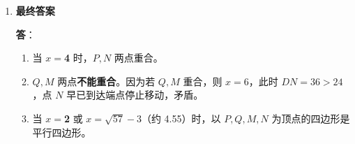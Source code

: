 \documentclass[UTF8]{ctexart}
\newenvironment{redenv}{\color{red}}{}
\newenvironment{detailedanalysis}{%
    \color{red}
    \begin{enumerate}[label=\textbf{第\arabic*步：}, leftmargin=*, align=left, itemsep=1.5ex]
}{%
    \end{enumerate}
}
\begin{document}
\begin{redenv}
\begin{detailedanalysis}
此时 $PN = x^2 + 2x - 24$

\begin{itemize}
    \item 若 $x < 6$：$QM = 24 - 4x$
    
    方程：$x^2 + 2x - 24 = 24 - 4x$
    \begin{align*}
    x^2 + 6x - 48 &= 0
    \end{align*}
    
    求根公式：$x = \dfrac{-6 + \sqrt{36 + 192}}{2} = \dfrac{-6 + \sqrt{228}}{2} = -3 + \sqrt{57} \approx 4.55$
    
    在 $(4, 6)$ 范围内，有效。
    
    \item 若 $x > 6$：$QM = 4x - 24$
    
    方程：$x^2 + 2x - 24 = 4x - 24$
    \begin{align*}
    x^2 - 2x &= 0 \\
    x(x - 2) &= 0
    \end{align*}
    
    $x = 0$（舍去）或 $x = 2$（不在 $x > 6$ 范围，舍去）
\end{itemize}

\textbf{约束条件检查}：

所有点都不能超出边界，即：
\begin{itemize}
    \item $AP = 2x \leq 24$，即 $x \leq 12$
    \item $BQ = x \leq 24$
    \item $CM = 3x \leq 24$，即 $x \leq 8$
    \item $DN = x^2 \leq 24$，即 $x \leq \sqrt{24} \approx 4.9$
\end{itemize}

最严格的约束是 $x \leq \sqrt{24} \approx 4.9$。

因此只有 $x = 2$ 和 $x = -3 + \sqrt{57} \approx 4.55$ 满足条件。

\item \textbf{最终答案}

\textbf{答}：
\begin{enumerate}[label=(\arabic*)]
    \item 当 $x = $\textbf{4} 时，$P, N$ 两点重合。
    
    \item $Q, M$ 两点\textbf{不能重合}。因为若 $Q, M$ 重合，则 $x = 6$，此时 $DN = 36 > 24$，点 $N$ 早已到达端点停止移动，矛盾。
    
    \item 当 $x = $\textbf{2} 或 $x = \sqrt{57} - 3$（约 4.55）时，以 $P, Q, M, N$ 为顶点的四边形是平行四边形。
\end{enumerate}
\end{detailedanalysis}


\end{redenv}
\end{document}
